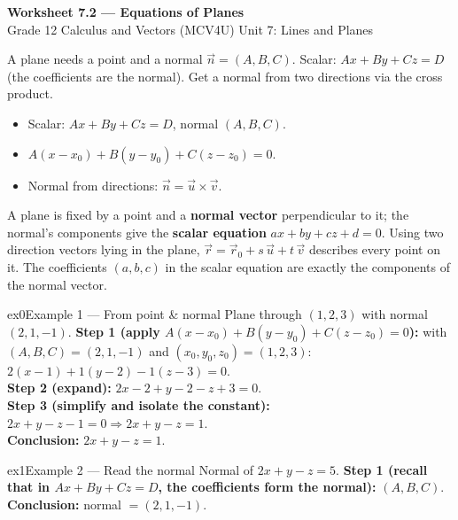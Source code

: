\documentclass[11pt]{article}
\begin{document}
\begin{center}
{\LARGE\bfseries\color{titleblue}Worksheet 7.2 --- Equations of Planes}\\[2pt]
{\small Grade 12 Calculus and Vectors (MCV4U) \textperiodcentered{} Unit 7: Lines and Planes}
\end{center}

\begin{ideabox}
A plane needs a point and a normal $\vec n=(A,B,C)$. Scalar: $Ax+By+Cz=D$ (the coefficients are the normal). Get a normal from two directions via the cross product.
\begin{itemize}[leftmargin=*,itemsep=2pt]
  \item Scalar: $Ax+By+Cz=D$, normal $(A,B,C)$.
  \item $A(x-x_0)+B(y-y_0)+C(z-z_0)=0$.
  \item Normal from directions: $\vec n=\vec u\times\vec v$.
\end{itemize}
\end{ideabox}

\begin{learnbox}
A plane is fixed by a point and a \textbf{normal vector} perpendicular to it; the normal's components give the \textbf{scalar equation} $ax+by+cz+d=0$.
Using two direction vectors lying in the plane, $\vec r=\vec r_0+s\,\vec u+t\,\vec v$ describes every point on it.
The coefficients $(a,b,c)$ in the scalar equation are exactly the components of the normal vector.
\end{learnbox}


\begin{example}{ex0}{Example 1 --- From point \& normal}
Plane through $(1,2,3)$ with normal $(2,1,-1)$.\soln
\textbf{Step 1 (apply $A(x-x_0)+B(y-y_0)+C(z-z_0)=0$):} with $(A,B,C)=(2,1,-1)$ and $(x_0,y_0,z_0)=(1,2,3)$: $2(x-1)+1(y-2)-1(z-3)=0$.\\[3pt]
\textbf{Step 2 (expand):} $2x-2+y-2-z+3=0$.\\[3pt]
\textbf{Step 3 (simplify and isolate the constant):} $2x+y-z-1=0\Rightarrow2x+y-z=1$.\\[3pt]
\textbf{Conclusion:} $2x+y-z=1$.
\end{example}

\begin{example}{ex1}{Example 2 --- Read the normal}
Normal of $2x+y-z=5$.\soln
\textbf{Step 1 (recall that in $Ax+By+Cz=D$, the coefficients form the normal):} $(A,B,C)$.\\[3pt]
\textbf{Conclusion:} normal $=(2,1,-1)$.
\end{example}
\end{document}
